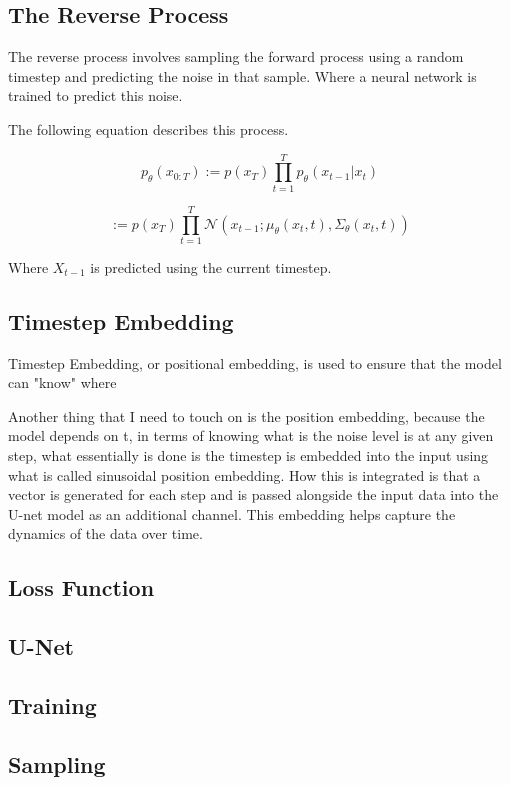\documentclass[conference]{IEEEtran}
\begin{document}
\subsection{The Reverse Process}

The reverse process involves sampling the forward process using a random timestep and predicting the noise in that sample. Where a neural network is trained to predict this noise.

The following equation describes this process.

$$
    p_{\theta}(x_{0:T})
    := p(x_{T}) \prod_{t=1}^T p_{\theta}(x_{t-1} | x_{t})
$$

$$
    := p(x_{T}) \prod_{t=1}^T \mathcal{N}(x_{t-1}; \mu_{\theta}(x_{t}, t), \Sigma_{\theta}(x_{t}, t))
$$

Where $X_{t-1}$ is predicted using the current timestep.

\subsection{Timestep Embedding}

Timestep Embedding, or positional embedding, is used to ensure that the model can "know" where

Another thing that I need to touch on is the position embedding, because the model depends on t, in terms of knowing what is the noise level is at any given step, what essentially is done is the timestep is embedded into the input using what is called sinusoidal position embedding. How this is integrated is that a vector is generated for each step and is passed alongside the input data into the U-net model as an additional channel. This embedding helps capture the dynamics of the data over time.


\subsection{Loss Function}



\subsection{U-Net}

\subsection{Training}

\subsection{Sampling}
\end{document}
